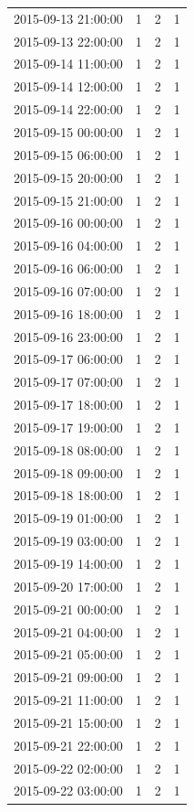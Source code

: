 \begin{tabular}{lrrr}
2015-09-13 21:00:00 & 1 & 2 & 1 \\
2015-09-13 22:00:00 & 1 & 2 & 1 \\
2015-09-14 11:00:00 & 1 & 2 & 1 \\
2015-09-14 12:00:00 & 1 & 2 & 1 \\
2015-09-14 22:00:00 & 1 & 2 & 1 \\
2015-09-15 00:00:00 & 1 & 2 & 1 \\
2015-09-15 06:00:00 & 1 & 2 & 1 \\
2015-09-15 20:00:00 & 1 & 2 & 1 \\
2015-09-15 21:00:00 & 1 & 2 & 1 \\
2015-09-16 00:00:00 & 1 & 2 & 1 \\
2015-09-16 04:00:00 & 1 & 2 & 1 \\
2015-09-16 06:00:00 & 1 & 2 & 1 \\
2015-09-16 07:00:00 & 1 & 2 & 1 \\
2015-09-16 18:00:00 & 1 & 2 & 1 \\
2015-09-16 23:00:00 & 1 & 2 & 1 \\
2015-09-17 06:00:00 & 1 & 2 & 1 \\
2015-09-17 07:00:00 & 1 & 2 & 1 \\
2015-09-17 18:00:00 & 1 & 2 & 1 \\
2015-09-17 19:00:00 & 1 & 2 & 1 \\
2015-09-18 08:00:00 & 1 & 2 & 1 \\
2015-09-18 09:00:00 & 1 & 2 & 1 \\
2015-09-18 18:00:00 & 1 & 2 & 1 \\
2015-09-19 01:00:00 & 1 & 2 & 1 \\
2015-09-19 03:00:00 & 1 & 2 & 1 \\
2015-09-19 14:00:00 & 1 & 2 & 1 \\
2015-09-20 17:00:00 & 1 & 2 & 1 \\
2015-09-21 00:00:00 & 1 & 2 & 1 \\
2015-09-21 04:00:00 & 1 & 2 & 1 \\
2015-09-21 05:00:00 & 1 & 2 & 1 \\
2015-09-21 09:00:00 & 1 & 2 & 1 \\
2015-09-21 11:00:00 & 1 & 2 & 1 \\
2015-09-21 15:00:00 & 1 & 2 & 1 \\
2015-09-21 22:00:00 & 1 & 2 & 1 \\
2015-09-22 02:00:00 & 1 & 2 & 1 \\
2015-09-22 03:00:00 & 1 & 2 & 1 \\

\end{tabular}
